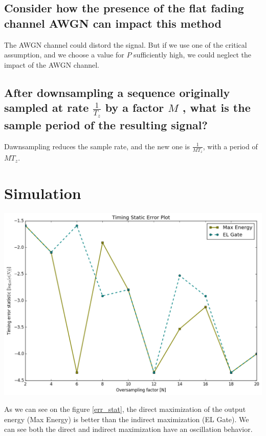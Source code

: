 \documentclass[frenchb, oneside, headings=normal]{scrartcl}
\begin{document}
\subsection{Consider how the presence of the flat fading channel AWGN can impact this method}

The AWGN channel could distord the signal. But if we use one of the critical assumption, and we choose a value for $P$ sufficiently high, we could neglect the impact of the AWGN channel.

\subsection{After downsampling a sequence originally sampled at rate $\frac{1}{T_z}$ by a factor $M$ , what is the sample period of the resulting signal?}

Dawnsampling reduces the sample rate, and the new one is $\frac{1}{MT_z}$, with a period of $MT_z$.

\section{Simulation}

\begin{center}
\includegraphics[width=.9\textwidth]{img/Timing-Static-Error}
\label{err_stat}
\end{center}

As we can see on the figure \ref{err_stat}, the direct maximization of the output energy (Max Energy) is better than the indirect maximization (EL Gate). We can see both the direct and indirect maximization have an oscillation behavior.
\end{document}
